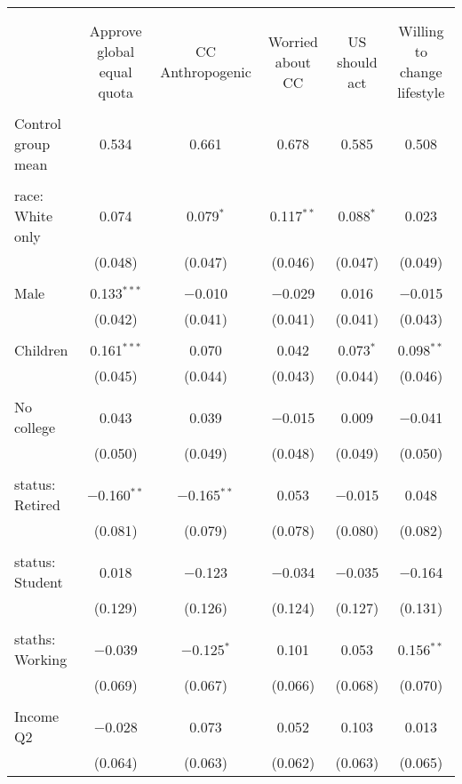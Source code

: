 
\begin{tabular}{@{\extracolsep{5pt}}lccccc} 
\\[-1.8ex]\hline 
\hline \\[-1.8ex] 
\\[-1.8ex] & Approve global equal quota & CC Anthropogenic & Worried about CC & US should act & Willing to change lifestyle \\ 
\hline \\[-1.8ex] 
 Control group mean & 0.534 & 0.661 & 0.678 & 0.585 & 0.508  \\ \hline \\[-1.8ex] race: White only & 0.074 & 0.079$^{*}$ & 0.117$^{**}$ & 0.088$^{*}$ & 0.023 \\ 
  & (0.048) & (0.047) & (0.046) & (0.047) & (0.049) \\ 
  & & & & & \\ 
 Male & 0.133$^{***}$ & $-$0.010 & $-$0.029 & 0.016 & $-$0.015 \\ 
  & (0.042) & (0.041) & (0.041) & (0.041) & (0.043) \\ 
  & & & & & \\ 
 Children & 0.161$^{***}$ & 0.070 & 0.042 & 0.073$^{*}$ & 0.098$^{**}$ \\ 
  & (0.045) & (0.044) & (0.043) & (0.044) & (0.046) \\ 
  & & & & & \\ 
 No college & 0.043 & 0.039 & $-$0.015 & 0.009 & $-$0.041 \\ 
  & (0.050) & (0.049) & (0.048) & (0.049) & (0.050) \\ 
  & & & & & \\ 
 status: Retired & $-$0.160$^{**}$ & $-$0.165$^{**}$ & 0.053 & $-$0.015 & 0.048 \\ 
  & (0.081) & (0.079) & (0.078) & (0.080) & (0.082) \\ 
  & & & & & \\ 
 status: Student & 0.018 & $-$0.123 & $-$0.034 & $-$0.035 & $-$0.164 \\ 
  & (0.129) & (0.126) & (0.124) & (0.127) & (0.131) \\ 
  & & & & & \\ 
 staths: Working & $-$0.039 & $-$0.125$^{*}$ & 0.101 & 0.053 & 0.156$^{**}$ \\ 
  & (0.069) & (0.067) & (0.066) & (0.068) & (0.070) \\ 
  & & & & & \\ 
 Income Q2 & $-$0.028 & 0.073 & 0.052 & 0.103 & 0.013 \\ 
  & (0.064) & (0.063) & (0.062) & (0.063) & (0.065) \\ 

\end{tabular}
